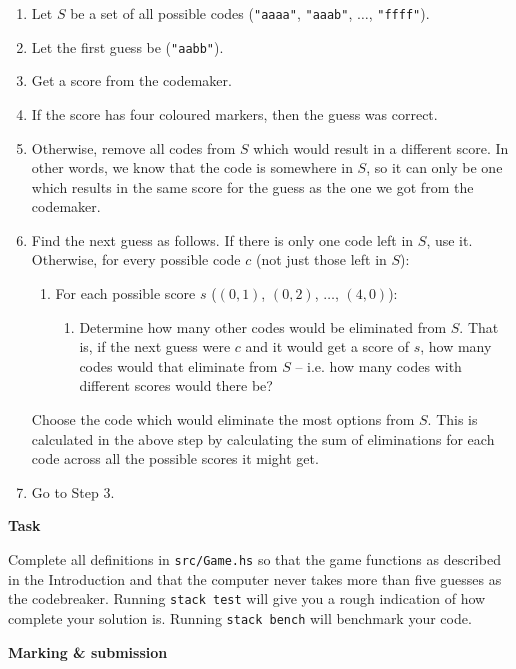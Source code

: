 \documentclass{../cs256-shared/cs256}
\begin{document}
\begin{enumerate}
\item Let $S$ be a set of all possible codes (\texttt{"aaaa"}, \texttt{"aaab"}, $\ldots$, \texttt{"ffff"}).
\item Let the first guess be (\texttt{"aabb"}).
\item Get a score from the codemaker.
\item If the score has four coloured markers, then the guess was correct.
\item Otherwise, remove all codes from $S$ which would result in a different score. In other words, we know that the code is somewhere in $S$, so it can only be one which results in the same score for the guess as the one we got from the codemaker. 
\item Find the next guess as follows. If there is only one code left in $S$, use it. Otherwise, for every possible code $c$ (not just those left in $S$):
\begin{enumerate}
    \item For each possible score $s$ ($(0,1)$, $(0,2)$, $\ldots$, $(4,0)$):
    \begin{enumerate}
        \item Determine how many other codes would be eliminated from $S$. That is, if the next guess were $c$ and it would get a score of $s$, how many codes would that eliminate from $S$ -- i.e. how many codes with different scores would there be?
    \end{enumerate}
\end{enumerate}
Choose the code which would eliminate the most options from $S$. This is calculated in the above step by calculating the sum of eliminations for each code across all the possible scores it might get.
\item Go to Step 3.
\end{enumerate}

\textbf{Task}

Complete all definitions in \texttt{src/Game.hs} so that the game functions as described in the Introduction and that the computer never takes more than five guesses as the codebreaker. Running \texttt{stack test} will give you a rough indication of how complete your solution is. Running \texttt{stack bench} will benchmark your code.

\pagebreak

\textbf{Marking \& submission}
\end{document}
